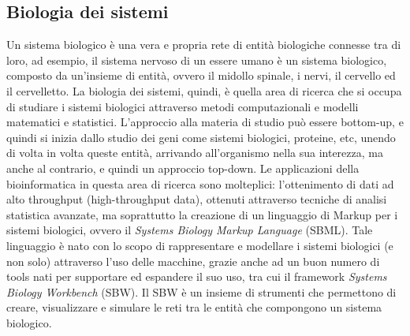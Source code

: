 \subsection{Biologia dei sistemi}
Un sistema biologico è una vera e propria rete di entità biologiche connesse tra di loro, ad esempio, il sistema nervoso di un essere umano è un sistema biologico, composto da un'insieme di entità, ovvero il midollo spinale, i nervi, il cervello ed il cervelletto.
\newline
La biologia dei sistemi, quindi, è quella area di ricerca che si occupa di studiare i sistemi biologici attraverso metodi computazionali e modelli matematici e statistici. L'approccio alla materia di studio può essere bottom-up, e quindi si inizia dallo studio dei geni come sistemi biologici, proteine, etc, unendo di volta in volta queste entità, arrivando all'organismo nella sua interezza, ma anche al contrario, e quindi un approccio top-down.
\newline
Le applicazioni della bioinformatica in questa area di ricerca sono molteplici: l'ottenimento di dati ad alto throughput (high-throughput data), ottenuti attraverso tecniche di analisi statistica avanzate, ma soprattutto la creazione di un linguaggio di Markup per i sistemi biologici, ovvero il \textit{Systems Biology Markup Language} (SBML)\cite{SBML}. Tale linguaggio è nato con lo scopo di rappresentare e modellare i sistemi biologici (e non solo) attraverso l'uso delle macchine, grazie anche ad un buon numero di tools nati per supportare ed espandere il suo uso, tra cui il framework \textit{Systems Biology Workbench} (SBW)\cite{SBW}. Il SBW è un insieme di strumenti che permettono di creare, visualizzare e simulare le reti tra le entità che compongono un sistema biologico.

